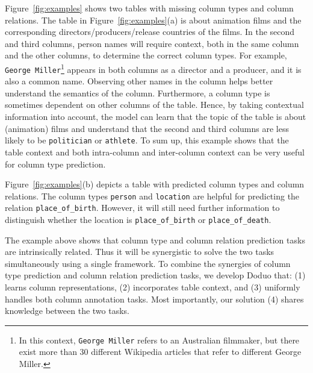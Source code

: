 \documentclass[sigconf]{acmart}
\newcommand{\name}{\mbox{\sc Doduo}}
\begin{document}
Figure~\ref{fig:examples} shows two tables with missing column types and column relations.
%
The table in Figure~\ref{fig:examples}(a) is about
animation films and the corresponding directors/producers/release countries of the films.  In the second and third columns, person names will require context, both in the same column and the other columns, to determine the correct column types. For example, {\tt George Miller}\footnote{In this context, {\tt George Miller} refers to an Australian filmmaker, but there exist more than 30 different Wikipedia articles that refer to different George Miller.} appears in both columns as a director and a producer, and it is also a common name. Observing other names in the column helps better understand the semantics of the column.
%
Furthermore, a column type is sometimes dependent on other columns of the table. Hence, by taking contextual information into account, the model can learn that the topic of the table is about (animation) films and understand that the second and third columns are less likely to be {\tt politician} or {\tt athlete}.
%
To sum up, this example shows that the table context and both intra-column and inter-column context can be very useful for column type prediction. 
%

Figure~\ref{fig:examples}(b) depicts a table with predicted column types and column relations. The column types {\tt person} and {\tt location} are helpful for predicting the relation {\tt place\_of\_birth}. However, 
it will still need further information to distinguish whether the location is {\tt place\_of\_birth} or {\tt place\_of\_death}.
%


The example above shows that column type and column relation prediction tasks are intrinsically related. Thus it will be synergistic to solve the two tasks simultaneously using a single framework.
%
To combine the synergies of column type prediction and column relation prediction tasks, we develop \name{} that:
%
(1) learns column representations, (2) incorporates table context, and (3) uniformly handles both column annotation tasks. Most importantly, our solution (4) shares knowledge between the two tasks. 
\end{document}
